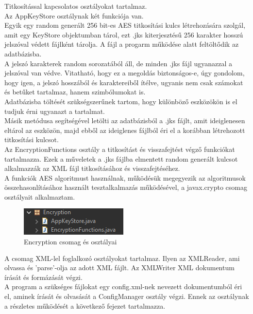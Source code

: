 Titkosítással kapcsolatos osztályokat tartalmaz.
\vspace{5pt}\\Az AppKeyStore osztálynak két funkciója van. 
\\Egyik egy random generált 256 bit-es AES titkosítási kulcs létrehozására szolgál, amit egy KeyStore objektumban tárol, ezt .jks kiterjesztésű 256 karakter hosszú jelszóval védett fájlként tárolja. A fájl a progarm működése alatt feltöltődik az adatbázisba.
\\A jelszó karakterek random sorozatából áll, de minden .jks fájl ugyanazzal a jelszóval van védve. Vitatható, hogy ez a megoldás biztonságos-e, úgy gondolom, hogy igen, a jelszó hosszából és karaktereiből ítélve, ugyanis nem csak számokat és betűket tartalmaz, hanem szimbólumokat is.
\\Adatbázisba töltését szükségszerűnek tartom, hogy különböző eszközökön is el tudjuk érni ugyanazt a tartalmat.
\\Másik metódusa segítségével letölti az adatbázisból a .jks fájlt, amit ideiglenesen eltárol az eszközön, majd ebből az ideiglenes fájlból éri el a korábban létrehozott titkosítási kulcsot.
\vspace{5pt}\\Az EncryptionFunctions osztály a titkosítást és visszafejtést végző funkciókat tartalmazza. Ezek a műveletek a .jks fájlba elmentett random generált kulcsot alkalmazzák az XML fájl titkosításához és visszafejtéséhez.
\\A funkciók AES algoritmust használnak, működésük megegyezik az algoritmusok összehasonlításához használt tesztalkalmazás működésével, a javax.crypto csomag osztályait alkalmaztam.

\begin{figure}[h]
	\centering
	\includegraphics[scale=0.7]{images/package_encryption.png}
	\caption{Encryption csomag és osztályai}
	\label{fig:package_encryption}
\end{figure}

A csomag XML-lel foglalkozó osztályokat tartalmaz. Ilyen az XMLReader, ami olvassa és 'parse'-olja az adott XML fájlt. Az XMLWriter XML dokumentum írását és formázását végzi.
\vspace{5pt}\\A program a szükséges fájlokat egy config.xml-nek nevezett dokumentumból éri el, aminek írását és olvasását a ConfigManager osztály végzi. Ennek az osztálynak a részletes működését a következő fejezet tartalmazza.



